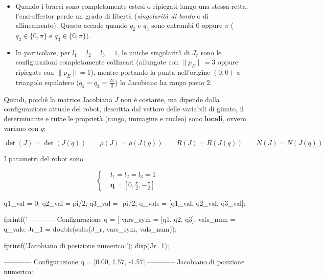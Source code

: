 \documentclass[11pt, a4paper]{article}
\begin{document}
\begin{itemize}

   \item{\begin{flushleft} Quando i bracci sono completamente estesi o ripiegati lungo una stessa retta, l'end-effector perde un grado di libertà (\textit{singolarità di bordo} o di allineamento). Questo accade quando $q_2$ e $q_3$ sono entrambi $0$ oppure $\pi$ ($q_2 \in \{0,\pi\}$ e $q_3 \in \{0,\pi\}$). \end{flushleft}}
   \item{\begin{flushleft} In particolare, per $l_1=l_2=l_3=1$, le uniche singolarità di $J_r$ sono le configurazioni completamente collineari (allungate con $\|p_E\| = 3$ oppure ripiegate con $\|p_E\| = 1$), mentre portando la punta nell'origine $(0,0)$ a triangolo equilatero ($q_2 = q_3 = \frac{2\pi}{3}$) lo Jacobiano ha rango pieno $2$. \end{flushleft}}
\end{itemize}

\begin{par}
\begin{flushleft}
Quindi, poiché la matrice Jacobiana $J$ non è costante, ma dipende dalla configurazione attuale del robot, descritta dal vettore delle variabili di giunto, il determinante e tutte le proprietà (rango, immagine e nucleo) sono \textbf{locali}, ovvero variano con $q$:
\end{flushleft}
\end{par}
\[
    \det(J)=\det(J(q)) \qquad \rho (J)=\rho(J(q)) \qquad R(J)=R(J(q)) \qquad N(J)=N(J(q))
\]

\vspace{1em}

\begin{par}
\begin{flushleft}
I parametri del robot sono
\end{flushleft}
\end{par}
\[
    \begin{cases}
    &l_1 =l_2 =l_3 =1\\
    &\mathbf{q} = [0, \frac{\pi }{2}, -\frac{\pi }{2}]
    \end{cases}
\]
\vspace{1em}
\begin{matlabcode}
q1_val = 0;
q2_val = pi/2;
q3_val = -pi/2;
q_vals = [q1_val, q2_val, q3_val];

fprintf('------------ Configurazione q = [%
vars_sym = [q1, q2, q3];
vals_num = q_vals;
Jr_1 = double(subs(J_r, vars_sym, vals_num));

fprintf('Jacobiano di posizione numerico:\n');
disp(Jr_1);
\end{matlabcode}
\begin{matlaboutput}
------------ Configurazione q = [0.00, 1.57, -1.57] ------------
Jacobiano di posizione numerico:
\end{matlaboutput}
\end{document}
